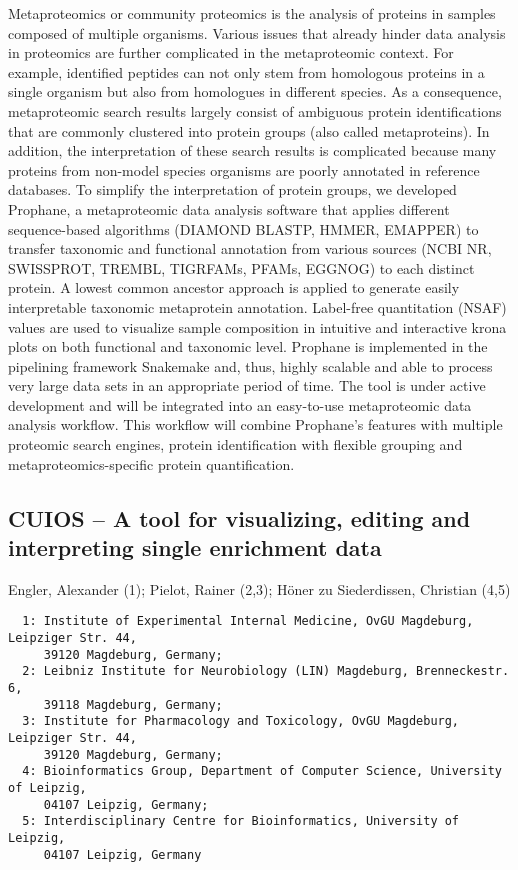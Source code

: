 {Metaproteomics or community proteomics is the analysis of proteins in samples composed of multiple organisms. Various issues that already hinder data analysis in proteomics are further complicated in the metaproteomic context. For example, identified peptides can not only stem from homologous proteins in a single organism but also from homologues in different species. As a consequence, metaproteomic search results largely consist of ambiguous protein identifications that are commonly clustered into protein groups (also called metaproteins). In addition, the interpretation of these search results is complicated because many proteins from non-model species organisms are poorly annotated in reference databases. To simplify the interpretation of protein groups, we developed Prophane, a metaproteomic data analysis software that applies different sequence-based algorithms (DIAMOND BLASTP, HMMER, EMAPPER) to transfer taxonomic and functional annotation from various sources (NCBI NR, SWISSPROT, TREMBL, TIGRFAMs, PFAMs, EGGNOG) to each distinct protein. A lowest common ancestor approach is applied to generate easily interpretable taxonomic metaprotein annotation. Label-free quantitation (NSAF) values are used to visualize sample composition in intuitive and interactive krona plots on both functional and taxonomic level. Prophane is implemented in the pipelining framework Snakemake and, thus, highly scalable and able to process very large data sets in an appropriate period of time. The tool is under active development and will be integrated into an easy-to-use metaproteomic data analysis workflow. This workflow will combine Prophane’s features with multiple proteomic search engines, protein identification with flexible grouping and metaproteomics-specific protein quantification.


\subsection*{\color{eubicRed} CUIOS -- A tool for visualizing, editing and interpreting single enrichment data}
{\color{eubicGray}Engler, Alexander (1);
Pielot, Rainer (2,3);
Höner zu Siederdissen, Christian (4,5)}
{\color{eubicGray}\begin{verbatim}
  1: Institute of Experimental Internal Medicine, OvGU Magdeburg, Leipziger Str. 44,
     39120 Magdeburg, Germany;
  2: Leibniz Institute for Neurobiology (LIN) Magdeburg, Brenneckestr. 6,
     39118 Magdeburg, Germany;
  3: Institute for Pharmacology and Toxicology, OvGU Magdeburg, Leipziger Str. 44,
     39120 Magdeburg, Germany;
  4: Bioinformatics Group, Department of Computer Science, University of Leipzig,
     04107 Leipzig, Germany;
  5: Interdisciplinary Centre for Bioinformatics, University of Leipzig,
     04107 Leipzig, Germany
\end{verbatim}}

}
